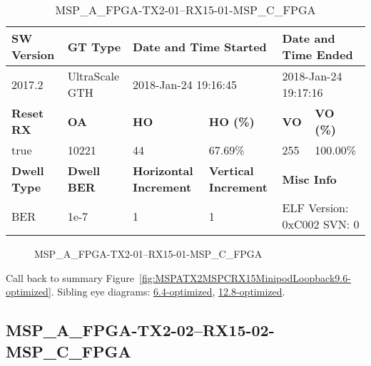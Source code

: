 \begin{table}[h]
\centering
\caption{MSP\_A\_FPGA-TX2-01--RX15-01-MSP\_C\_FPGA}
\label{tab:MSPAFPGATX201RX1501MSPCFPGA9.6-optimized}
\begin{tabular}{@{}|l|l|l|l|l|l|@{}}
\toprule
\textbf{SW Version}                & \textbf{GT Type}   & \multicolumn{2}{l|}{\textbf{Date and Time Started}}            & \multicolumn{2}{l|}{\textbf{Date and Time Ended}}        \\ \midrule
2017.2                       & UltraScale GTH          & \multicolumn{2}{l|}{2018-Jan-24 19:16:45}                   & \multicolumn{2}{l|}{2018-Jan-24 19:17:16}               \\ \midrule
\textbf{Reset RX}                  & \textbf{OA} & \textbf{HO}   & \textbf{HO (\%)} & \textbf{VO} & \textbf{VO (\%)} \\ \midrule
true & 10221        & 44          & 67.69\%        & 255        & 100.00\%       \\ \midrule
\textbf{Dwell Type}                & \textbf{Dwell BER} & \textbf{Horizontal Increment} & \textbf{Vertical Increment}    & \multicolumn{2}{l|}{\textbf{Misc Info}}                  \\ \midrule
BER                            & 1e-7        & 1        & 1           & \multicolumn{2}{l|}{ELF Version: 0xC002 SVN: 0}                         \\ \bottomrule
\end{tabular}
\end{table}

\begin{figure}[h]
\caption{MSP\_A\_FPGA-TX2-01--RX15-01-MSP\_C\_FPGA} \label{fig:MSPAFPGATX201RX1501MSPCFPGA9.6-optimized}
\end{figure}

Call back to summary Figure~\ref{fig:MSPATX2MSPCRX15MinipodLoopback9.6-optimized}.
Sibling eye diagrams: \hyperref[sec:MSPAFPGATX201RX1501MSPCFPGA6.4-optimized]{6.4-optimized}, \hyperref[sec:MSPAFPGATX201RX1501MSPCFPGA12.8-optimized]{12.8-optimized}.

\clearpage
\newpage


\subsection{MSP\_A\_FPGA-TX2-02--RX15-02-MSP\_C\_FPGA}\label{sec:MSPAFPGATX202RX1502MSPCFPGA9.6-optimized}

